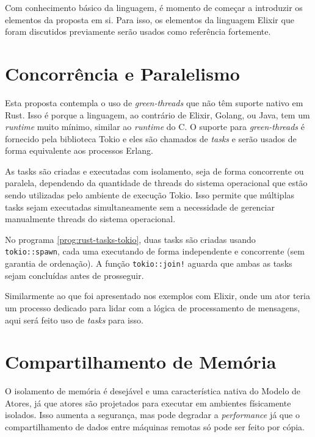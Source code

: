 Com conhecimento básico da linguagem, é momento de começar a introduzir os elementos da proposta em si. Para isso, os elementos da linguagem Elixir que foram discutidos previamente serão usados como referência fortemente.

\section{Concorrência e Paralelismo}

Esta proposta contempla o uso de \emph{green-threads} que não têm suporte nativo em Rust. Isso é porque a linguagem, ao contrário de Elixir, Golang, ou Java, tem um \emph{runtime} muito mínimo, similar ao \emph{runtime} do C. O suporte para \emph{green-threads} é fornecido pela biblioteca Tokio \citep{tokio} e eles são chamados de \emph{tasks} e serão usados de forma equivalente aos processos Erlang.

As tasks são criadas e executadas com isolamento, seja de forma concorrente ou paralela, dependendo da quantidade de threads do sistema operacional que estão sendo utilizadas pelo ambiente de execução Tokio. Isso permite que múltiplas tasks sejam executadas simultaneamente sem a necessidade de gerenciar manualmente threads do sistema operacional.

\begin{program}
  
  \caption{Exemplo de tasks concorrentes com Tokio.\label{prog:rust-tasks-tokio}}
\end{program}

No programa \ref{prog:rust-tasks-tokio}, duas tasks são criadas usando \texttt{tokio::spawn}, cada uma executando de forma independente e concorrente (sem garantia de ordenação). A função \texttt{tokio::join!} aguarda que ambas as tasks sejam concluídas antes de prosseguir.

Similarmente ao que foi apresentado nos exemplos com Elixir, onde um ator teria um processo dedicado para lidar com a lógica de processamento de mensagens, aqui será feito uso de \emph{tasks} para isso.

\section{Compartilhamento de Memória}

O isolamento de memória é desejável e uma característica nativa do Modelo de Atores, já que atores são projetados para executar em ambientes físicamente isolados. Isso aumenta a segurança, mas pode degradar a \emph{performance} já que o compartilhamento de dados entre máquinas remotas só pode ser feito por cópia.

